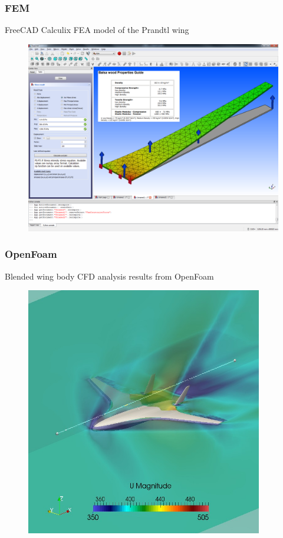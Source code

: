 \documentclass{beamer}
\begin{document}
\begin{frame}
\frametitle{FEM}

FreeCAD Calculix FEA model of the Prandtl wing

\begin{figure}
        \includegraphics[width=0.7\linewidth]{Pictures/Prandtl2FreeCAD_FEM.png}
\end{figure}


\end{frame}

\begin{frame}
\frametitle{OpenFoam}

Blended wing body CFD analysis results from OpenFoam

\begin{figure}
\includegraphics[width=0.4\linewidth]{Pictures/OpenFoamBWB.png}
\end{figure}

\end{frame}
\end{document}
